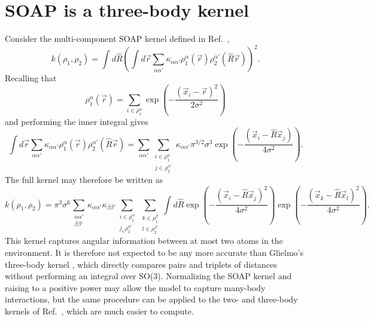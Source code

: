 \documentclass[%
preprint,
amsmath,amssymb,
aps,
]{revtex4-1}
\begin{document}
\section{SOAP is a three-body kernel}
Consider the multi-component SOAP kernel defined in Ref.\ \cite{de2016comparing},
\begin{equation}
    k(\rho_1, \rho_2) = \int d\hat{R} \left( \int d\vec{r} \sum_{\alpha \alpha'} \kappa_{\alpha \alpha'} \rho_1^\alpha(\vec{r}) \rho_2^{\alpha'} (\hat{R} \vec{r}) \right)^2.
\end{equation}
Recalling that
\begin{equation}
    \rho_1^\alpha(\vec{r}) = \sum_{i \in \rho_1^\alpha} \exp\left(-\frac{(\vec{x}_i - \vec{r})^2}{2\sigma^2}\right)
\end{equation}
and performing the inner integral gives
\begin{equation}
\int d\vec{r} \sum_{\alpha \alpha'} \kappa_{\alpha \alpha'} \rho_1^\alpha(\vec{r}) \rho_2^{\alpha'}(\hat{R} \vec{r}) = \sum_{\alpha \alpha'} \sum\limits_{\substack{i\in\rho_1^\alpha \\ j\in\rho_2^{\alpha'}}} \kappa_{\alpha\alpha'}\pi^{3/2}\sigma^3 \exp\left(-\frac{(\vec{x}_i-\hat{R}\vec{x}_j)}{4\sigma^2}\right).
\end{equation}
The full kernel may therefore be written as
\begin{equation}
k(\rho_1, \rho_2) = \pi^3 \sigma^6 \sum\limits_{\substack{\alpha\alpha' \\ \beta\beta'}} \kappa_{\alpha\alpha'} \kappa_{\beta\beta'} \sum\limits_{\substack{i\in\rho_1^\alpha \\ j_\in\rho_2^{\alpha'}}} \sum\limits_{\substack{k \in \rho_1^\beta \\ l \in \rho_2^{\beta'}}} \int d\hat{R} \exp\left(-\frac{(\vec{x}_i - \hat{R}\vec{x}_j)^2}{4 \sigma^2}\right)\exp\left(-\frac{(\vec{x}_k - \hat{R}\vec{x}_l)^2}{4 \sigma^2}\right).
\end{equation}
This kernel captures angular information between at most two atoms in the environment. It is therefore not expected to be any more accurate than Glielmo's three-body kernel \cite{glielmo2018efficient}, which directly compares pairs and triplets of distances without performing an integral over SO(3). Normalizing the SOAP kernel and raising to a positive power may allow the model to capture many-body interactions, but the same procedure can be applied to the two- and three-body kernels of Ref.\ \cite{glielmo2018efficient}, which are much easier to compute.
\end{document}
